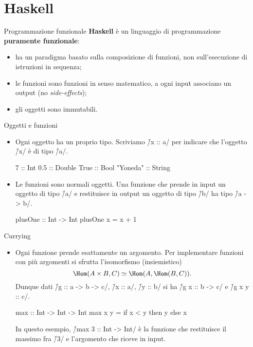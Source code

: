 \section{Haskell}

\begin{frame}[fragile]{\secname}{Programmazione funzionale}
\textbf{Haskell} è un linguaggio di programmazione \textbf{puramente funzionale}:
\begin{itemize}[<+(1)->]
\item ha un paradigma basato sulla composizione di funzioni, non sull'esecuzione di istruzioni in sequenza;
\item le funzioni sono funzioni in senso matematico, a ogni input associano un output (no \emph{side-effects});
\item gli oggetti sono immutabili.
\end{itemize}
\end{frame}

\begin{frame}[fragile]{\secname}{Oggetti e funzioni}
\begin{itemize}
\item Ogni oggetto ha un proprio tipo. Scriviamo \h/x :: a/ per indicare che l'oggetto \h/x/ è di tipo \h/a/.

\pause

\begin{haskellcode}
7        :: Int
0.5      :: Double
True     :: Bool
"Yoneda" :: String
\end{haskellcode}

\item<3-> Le funzioni sono normali oggetti. Una funzione che prende in input un oggetto di tipo \h/a/ e restituisce in output un oggetto di tipo \h/b/ ha tipo \h/a -> b/.

\pause\pause

\begin{haskellcode}
plusOne :: Int -> Int
plusOne x = x + 1
\end{haskellcode}

\end{itemize}
\end{frame}

\begin{frame}[fragile]{\secname}{Currying}
\begin{itemize}
\item Ogni funzione prende esattamente un argomento. Per implementare funzioni con più argomenti si sfrutta l'isomorfismo (insiemistico)
\[
\Hom(A\times B,C)\simeq\Hom(A,\Hom(B,C)).
\]
\pause
Dunque dati \h/g :: a -> b -> c/, \h/x :: a/, \h/y :: b/ si ha \h/g x :: b -> c/ e \h/g x y :: c/.

\pause
\begin{haskellcode}
max :: Int -> Int -> Int
max x y = if x < y then y else x
\end{haskellcode}

\pause
In questo esempio, \h/max 3 :: Int -> Int/ è la funzione che restituisce il massimo fra \h/3/ e l'argomento che riceve in input.
\end{itemize}
\end{frame}

